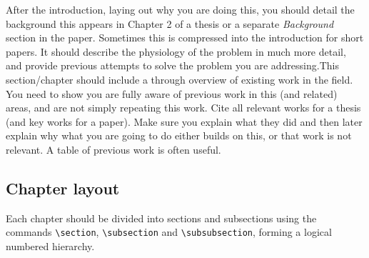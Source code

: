 












After the introduction, laying out why you are doing this, you should detail the background 
this appears in Chapter 2 of a thesis or a separate {\it Background} section in the paper. Sometimes this is compressed into the introduction for short papers. 
It should describe the physiology of the problem in much more detail, and provide previous attempts to solve the problem you are addressing.This section/chapter should include a through overview of existing work in the field. You need to show you are fully aware of previous work in this (and related) areas, and are not simply repeating this work. Cite all relevant works for a thesis (and key works for a paper). Make sure you explain what they did and then later explain why what you are going to do either builds on this, or that work is not relevant. A table of previous work is often useful.

\subsection{Chapter layout}
Each chapter should be divided into sections and subsections 
using the commands \verb|\section|, \verb|\subsection| 
and \verb|\subsubsection|, forming a logical numbered hierarchy. 

